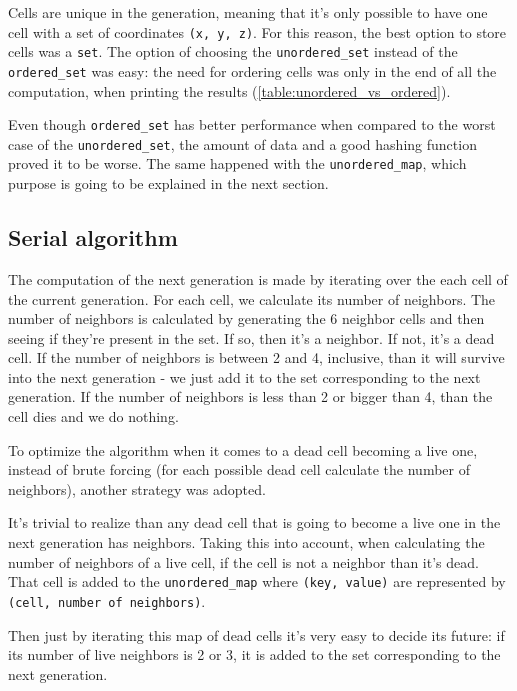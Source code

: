 \documentclass[11pt,english]{article}
\begin{document}
Cells are unique in the generation, meaning that it's only possible to have one
cell with a set of coordinates \texttt{(x, y, z)}. For this reason, the best 
option to store cells was a \texttt{set}. The option of choosing the 
\texttt{unordered\_set} instead of the \texttt{ordered\_set} was easy: the need 
for ordering cells was only in the end of all the computation, when printing 
the results (\ref{table:unordered_vs_ordered}).  

Even though \texttt{ordered\_set} has better performance when compared to the 
worst case of the \texttt{unordered\_set}, the amount of data and a good 
hashing function proved it to be worse. The same happened with the 
\texttt{unordered\_map}, which purpose is going to be explained in the next 
section.

\subsection{Serial algorithm}

The computation of the next generation is made by iterating over the each cell 
of the current generation. For each cell, we calculate its number of neighbors.
The number of neighbors is calculated by generating the 6 neighbor cells and 
then seeing if they're present in the set. If so, then it's a neighbor. If not, 
it's a dead cell.
If the number of neighbors is between 2 and 4, inclusive, than it will survive 
into the next generation - we just add it to the set corresponding to the next 
generation. If the number of neighbors is less than 2 or bigger than 4, than 
the cell dies and we do nothing. 

To optimize the algorithm when it comes to a dead cell becoming a live one, 
instead of brute forcing (for each possible dead cell calculate the number of 
neighbors), another strategy was adopted. 

It's trivial to realize than any dead cell that is going to become a live one 
in the next generation has neighbors. Taking this into account, when calculating 
the number of neighbors of a live cell, if the cell is not a neighbor than it's
dead. That cell is added to the \texttt{unordered\_map} where 
\texttt{(key, value)} are represented by \texttt{(cell, number of neighbors)}. 

Then just by iterating this map of dead cells it's very easy to decide its 
future: if its number of live neighbors is 2 or 3, it is added to the set 
corresponding to the next generation.
\end{document}
